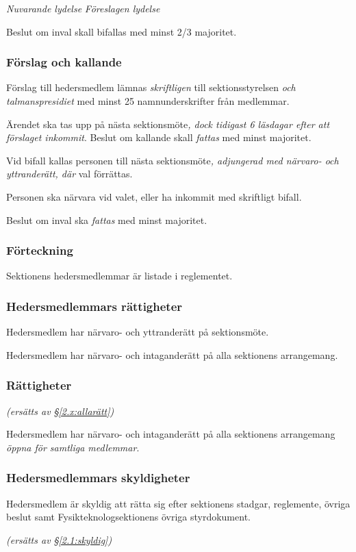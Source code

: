 \documentclass{article}
\newenvironment{lydelse}
    {\begin{paracol}{2}%
        \emph{Nuvarande lydelse}%
        \switchcolumn%
        \emph{Föreslagen lydelse}%
    \end{paracol}%
    \begin{enumerate}[label=\thesubsection.\arabic*]%
    \begin{paracol}{2}%
    }{\end{paracol}\end{enumerate}}
\newcommand{\itemb}{\item[\textbullet]}
\begin{document}
\begin{lydelse}
    \itemb Beslut om inval skall bifallas med minst 2/3 majoritet.
    
\switchcolumn
    \subsubsection*{Förslag och kallande}%
    
    \item Förslag till hedersmedlem lämnas \emph{skriftligen} till sektionsstyrelsen \emph{och talmanspresidiet} med minst 25 namnunderskrifter från medlemmar.

    \item Ärendet ska tas upp på nästa sektionsmöte\emph{, dock tidigast 6 läsdagar efter att förslaget inkommit}.
    Beslut om kallande skall \emph{fattas} med minst  majoritet. \label{maj:hm1}
    
    \item Vid bifall kallas personen till nästa sektionsmöte\emph{, adjungerad med närvaro- och yttranderätt, där} val förrättas.

    \item Personen ska närvara vid valet, eller ha inkommit med skriftligt bifall.

    \item Beslut om inval ska \emph{fattas} med minst  majoritet. \label{maj:hm2}
    
\switchcolumn*
    \subsubsection*{Förteckning}%
    \itemb Sektionens hedersmedlemmar är listade i reglementet.
    
\switchcolumn
\switchcolumn*
    \subsubsection*{Hedersmedlemmars rättigheter}%
    \itemb Hedersmedlem har närvaro- och yttranderätt på sektionsmöte.
    
    \itemb Hedersmedlem har närvaro- och intaganderätt på alla sektionens
arrangemang.
    
\switchcolumn
    \subsubsection*{Rättigheter}%
    \emph{(ersätts av \S \ref{2.x:allarätt})}
    
    \item Hedersmedlem har närvaro- och intaganderätt på alla sektionens arrangemang \emph{öppna för samtliga medlemmar}.

\switchcolumn*
    \subsubsection*{Hedersmedlemmars skyldigheter}%
    \itemb Hedersmedlem är skyldig att rätta sig efter sektionens stadgar, regle\-mente, övriga beslut samt  Fysikteknologsektionens övriga styrdokument.
    
\switchcolumn
    \emph{(ersätts av \S \ref{2.1:skyldig})}
\end{lydelse}
\end{document}
